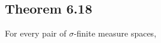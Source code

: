 \documentclass[../../main.tex]{subfiles}
\begin{document}
\subsection{Theorem 6.18}
\begin{wts}
For every pair of $\sigma$-finite measure spaces, 
\end{wts}
\end{document}
